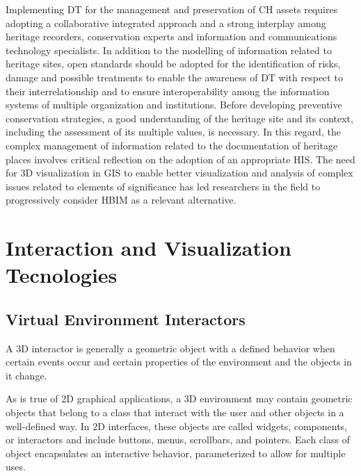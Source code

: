 Implementing \gls{DT} for the management and preservation of \gls{CH} assets requires adopting a collaborative integrated approach and a strong
interplay among heritage recorders, conservation experts and information and communications technology specialists.
In addition to the modelling of information related to heritage sites, open standards should
be adopted for the identification of risks, damage and possible treatments to enable the awareness
of \gls{DT} with respect to their interrelationship and to ensure interoperability among the information
systems of multiple organization and institutions. Before developing preventive conservation strategies, a
good understanding of the heritage site and its context, including the assessment of its multiple values,
is necessary. In this regard, the complex management of information related to the documentation
of heritage places involves critical reflection on the adoption of an appropriate \gls{HIS}. The need for \gls{3D} visualization in \gls{GIS} to enable better
visualization and analysis of complex issues related to elements of significance has led researchers
in the field to progressively consider \gls{HBIM} as a relevant alternative.
~\cite{jouan2020digital}


\section{Interaction and Visualization Tecnologies}
\label{sec:interaction_visualization}


\subsection{Virtual Environment Interactors}
\label{sec:interactors}


A \gls{3D} interactor is generally a geometric object with a defined behavior when certain events 
occur and certain properties of the environment and the objects in it change. 

 As is true of \gls{2D} graphical applications, a \gls{3D} environment may contain geometric objects that 
belong to a class that interact with the user and other objects in a well-defined way. In \gls{2D} interfaces, 
these objects are called widgets, components, or interactors and include buttons, menus, scrollbars, 
and pointers. Each class of object encapsulates an interactive behavior, parameterized to allow for 
multiple uses. 



